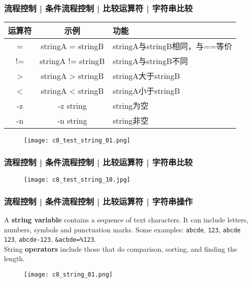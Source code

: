 \begin{frame}
  \frametitle{流程控制 | 条件流程控制 | 比较运算符 | \alert{字符串比较}}
  \begin{table}
    \centering
    \begin{tabularx}{\textwidth}{ccX}
      \hline
      \rowcolor{blue!50}运算符 & 示例 & 功能\\
      \hline
      = & stringA = stringB & stringA与stringB相同，与==等价\\
      != & stringA != stringB & stringA与stringB不同\\
      > & stringA > stringB & stringA大于stringB\\
      < & stringA < stringB & stringA小于stringB\\
      -z & -z string & string为空\\
      -n & -n string & string非空\\
      \hline
    \end{tabularx}
  \end{table}
  \begin{figure}
    \centering
    \texttt{[image: c8\_test\_string\_01.png]}
  \end{figure}
\end{frame}

\begin{frame}
  \frametitle{流程控制 | 条件流程控制 | 比较运算符 | 字符串比较}
  \begin{figure}
    \centering
    \texttt{[image: c8\_test\_string\_10.jpg]}
  \end{figure}
\end{frame}

\begin{frame}[fragile]
  \frametitle{流程控制 | 条件流程控制 | 比较运算符 | 字符串操作}
  A \textbf{string variable} contains a sequence of text characters. It can include letters, numbers, symbols and punctuation marks. Some examples: \verb|abcde|, \verb|123|, \verb|abcde 123|, \verb|abcde-123|, \verb|&acbde=%123|.\\
  \vspace{0.2cm}
  String \textbf{operators} include those that do comparison, sorting, and finding the length.
  \begin{figure}
    \centering
    \texttt{[image: c8\_string\_01.png]}
  \end{figure}
\end{frame}


